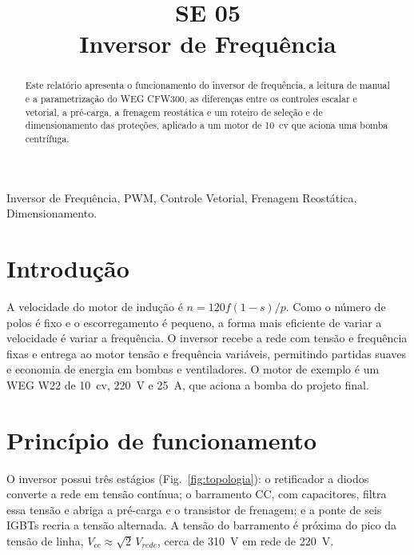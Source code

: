 \documentclass[conference]{IEEEtran}
\begin{document}
\raggedbottom

\title{SE 05\\Inversor de Frequência}

\author{
}

\maketitle

\begin{abstract}
Este relatório apresenta o funcionamento do inversor de frequência, a leitura de manual e a parametrização do WEG CFW300, as diferenças entre os controles escalar e vetorial, a pré-carga, a frenagem reostática e um roteiro de seleção e de dimensionamento das proteções, aplicado a um motor de 10~cv que aciona uma bomba centrífuga.
\end{abstract}

\begin{IEEEkeywords}
Inversor de Frequência, PWM, Controle Vetorial, Frenagem Reostática, Dimensionamento.
\end{IEEEkeywords}

\section{Introdução}

A velocidade do motor de indução é $n=120f(1-s)/p$. Como o número de polos é fixo e o escorregamento é pequeno, a forma mais eficiente de variar a velocidade é variar a frequência. O inversor recebe a rede com tensão e frequência fixas e entrega ao motor tensão e frequência variáveis, permitindo partidas suaves e economia de energia em bombas e ventiladores. O motor de exemplo é um WEG W22 de 10~cv, 220~V e 25~A, que aciona a bomba do projeto final.

\section{Princípio de funcionamento}

O inversor possui três estágios (Fig.~\ref{fig:topologia}): o retificador a diodos converte a rede em tensão contínua; o barramento CC, com capacitores, filtra essa tensão e abriga a pré-carga e o transistor de frenagem; e a ponte de seis IGBTs recria a tensão alternada. A tensão do barramento é próxima do pico da tensão de linha, $V_{cc}\approx\sqrt{2}\,V_{rede}$, cerca de 310~V em rede de 220~V.
\end{document}
